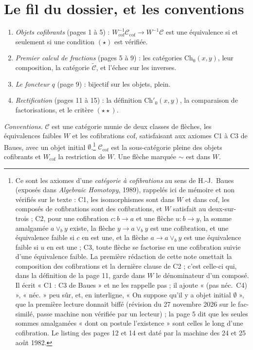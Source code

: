 \documentclass[11pt,a4paper]{article}
\begin{document}
\section*{Le fil du dossier, et les conventions}

\begin{enumerate}
\item[1.] \emph{Objets cofibrants} (pages 1 à 5) :
$W_{\mathrm{cof}}^{-1}\mathcal{C}_{\mathrm{cof}} \to W^{-1}\mathcal{C}$ est une
équivalence si et seulement si une condition $(\star)$ est vérifiée.
\item[2.] \emph{Premier calcul de fractions} (pages 5 à 9) : les catégories
$\mathrm{Ch}_{0}(x,y)$, leur composition, la catégorie
$\widetilde{\mathcal{C}}$, et l'échec sur les inverses.
\item[3.] \emph{Le foncteur $q$} (page 9) : bijectif sur les objets, plein.
\item[4.] \emph{Rectification} (pages 11 à 15) : la définition
$\mathrm{Ch}'_{0}(x,y)$, la comparaison de factorisations, et le critère
$(\star\star)$.
\end{enumerate}

\emph{Conventions.} $\mathcal{C}$ est une catégorie munie de deux classes de
flèches, les équivalences faibles $W$ et les cofibrations
$\mathrm{cof}$, satisfaisant aux axiomes C1 à C3 de Baues, avec un objet
initial $\emptyset$.\footnote{Ce sont les axiomes d'une \emph{catégorie à
cofibrations} au sens de H.-J.~Baues (exposés dans \emph{Algebraic Homotopy},
1989), rappelés ici de mémoire et non vérifiés sur le texte : C1, les
isomorphismes sont dans $W$ et dans $\mathrm{cof}$, les composés de
cofibrations sont des cofibrations, et $W$ satisfait au deux-sur-trois ; C2,
pour une cofibration $c : b \to a$ et une flèche $u : b \to y$, la somme
amalgamée $a \vee_{b} y$ existe, la flèche $y \to a \vee_{b} y$ est une
cofibration, et une équivalence faible si $c$ en est une, et la flèche
$a \to a \vee_{b} y$ est une équivalence faible si $u$ en est une ; C3, toute
flèche se factorise en une cofibration suivie d'une équivalence faible. La
première rédaction de cette note omettait la composition des cofibrations et
la dernière clause de C2 ; c'est celle-ci qui, dans la définition de la page
11, garde dans $W$ le dénominateur d'un composé. Il écrit « C1 : C3 de
Baues » et ne les rappelle pas ; il ajoute « (pas néc.\ C4) », « néc. » peu
sûr, et, en interligne, « On suppose qu'il y a objet initial $\emptyset$ »,
que la première lecture donnait biffé (révision du 27 novembre 2026 sur le
fac-similé, passe machine non vérifiée par un lecteur) ; la page 5 dit que les seules sommes amalgamées « dont
on postule l'existence » sont celles le long d'une cofibration. Le listing
des pages 12 et 14 est daté par la machine des 24 et 25 août 1982.}
$\mathcal{C}_{\mathrm{cof}}$ est la sous-catégorie pleine des objets
cofibrants et $W_{\mathrm{cof}}$ la restriction de $W$. Une flèche marquée
$\sim$ est dans $W$.
\end{document}

